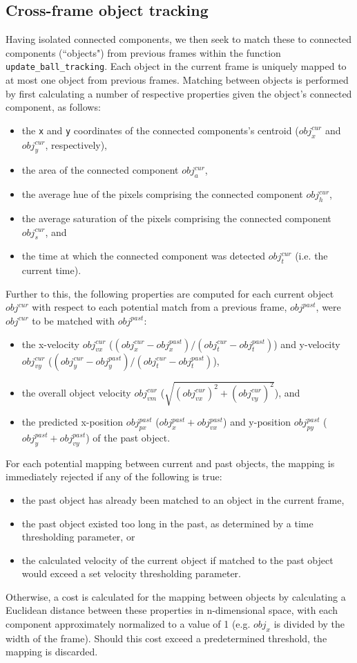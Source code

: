 \documentclass[12pt,a4paper]{article}
\begin{document}
\subsection{Cross-frame object tracking}
Having isolated connected components, we then seek to match these to connected components (``objects") from previous frames within the function \texttt{update\_ball\_tracking}. Each object in the current frame is uniquely mapped to at most one object from previous frames. Matching between objects is performed by first calculating a number of respective properties given the object's connected component, as follows:
\begin{itemize}
\item the \texttt{x} and \texttt{y} coordinates of the connected components's centroid ($obj_x^{cur}$ and $obj_y^{cur}$, respectively),
\item the area of the connected component $obj_{a}^{cur}$,
\item the average hue of the pixels comprising the connected component $obj_{h}^{cur}$,
\item the average saturation of the pixels comprising the connected component $obj_{s}^{cur}$, and
\item the time at which the connected component was detected $obj_{t}^{cur}$ (i.e. the current time).
\end{itemize}
Further to this, the following properties are computed for each current object $obj^{cur}$ with respect to each potential match from a previous frame, $obj^{past}$, were $obj^{cur}$ to be matched with $obj^{past}$:
\begin{itemize}
\item the x-velocity $obj_{vx}^{cur}$ ($(obj_x^{cur} - obj_x^{past}) / (obj_t^{cur} - obj_t^{past})$) and y-velocity $obj_{vy}^{cur}$ ($(obj_y^{cur} - obj_y^{past}) / (obj_t^{cur} - obj_t^{past})$),
\item the overall object velocity $obj_{vm}^{cur}$ ($\sqrt{(obj_{vx}^{cur})^2 + (obj_{vy}^{cur})^2}$), and
\item the predicted x-position $obj_{px}^{past}$ ($obj_x^{past} + obj_{vx}^{past}$) and y-position $obj_{py}^{past}$ ($obj_y^{past} + obj_{vy}^{past}$) of the past object.
\end{itemize}
For each potential mapping between current and past objects, the mapping is immediately rejected if any of the following is true:
\begin{itemize}
\item the past object has already been matched to an object in the current frame,
\item the past object existed too long in the past, as determined by a time thresholding parameter, or
\item the calculated velocity of the current object if matched to the past object would exceed a set velocity thresholding parameter.
\end{itemize}
Otherwise, a cost is calculated for the mapping between objects by calculating a Euclidean distance between these properties in n-dimensional space, with each component approximately normalized to a value of 1 (e.g. $obj_{x}$ is divided by the width of the frame). Should this cost exceed a predetermined threshold, the mapping is discarded.
\end{document}

